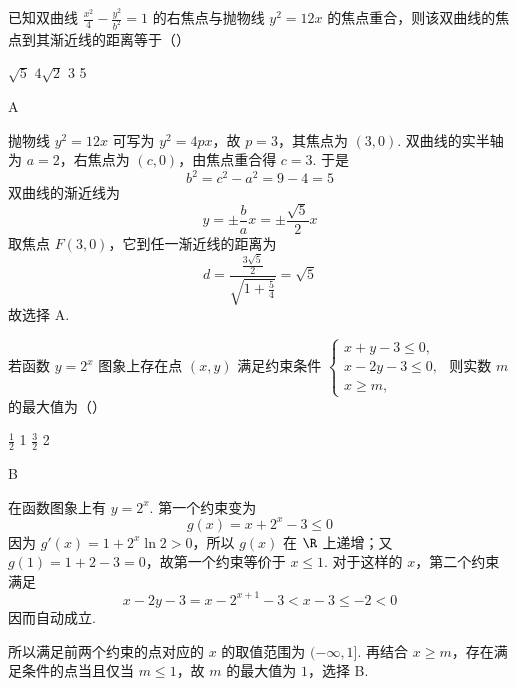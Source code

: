 \begin{problem}
已知双曲线 \(\frac{x^{2}}{4} - \frac{y^{2}}{b^{2}} = 1\) 的右焦点与抛物线 \(y^{2} = 12x\) 的焦点重合，则该双曲线的焦点到其渐近线的距离等于（\quad）

\choices
    {\(\sqrt{5}\)}
    {\(4\sqrt{2}\)}
    {3}
    {5}
\end{problem}

\begin{answer}
A
\end{answer}

\begin{solution}
抛物线 \(y^{2}=12x\) 可写为 \(y^{2}=4px\)，故 \(p=3\)，其焦点为 \((3,0)\). 双曲线的实半轴为 \(a=2\)，右焦点为 \((c,0)\)，由焦点重合得 \(c=3\). 于是
\[
b^{2}=c^{2}-a^{2}=9-4=5
\]
双曲线的渐近线为
\[
y=\pm\frac{b}{a}x=\pm\frac{\sqrt5}{2}x
\]
取焦点 \(F(3,0)\)，它到任一渐近线的距离为
\[
d=\frac{\frac{3\sqrt5}{2}}{\sqrt{1+\frac54}}=\sqrt5
\]
故选择 A.
\end{solution}

\begin{problem}
若函数 \(y = 2^{x}\) 图象上存在点 \((x,y)\) 满足约束条件 \(\begin{cases}
x + y - 3 \leqslant 0,\\
x - 2y - 3 \leqslant 0,\\
x \geqslant m,
\end{cases}\) 则实数 \(m\) 的最大值为（\quad）

\choices
    {\(\frac{1}{2}\)}
    {1}
    {\(\frac{3}{2}\)}
    {2}
\end{problem}

\begin{answer}
B
\end{answer}

\begin{solution}
在函数图象上有 \(y=2^{x}\). 第一个约束变为
\[
g(x)=x+2^{x}-3\leqslant0
\]
因为 \(g'(x)=1+2^{x}\ln2>0\)，所以 \(g(x)\) 在 \(\R\) 上递增；又 \(g(1)=1+2-3=0\)，故第一个约束等价于 \(x\leqslant1\). 对于这样的 \(x\)，第二个约束满足
\[
x-2y-3=x-2^{x+1}-3<x-3\leqslant-2<0
\]
因而自动成立.

所以满足前两个约束的点对应的 \(x\) 的取值范围为 \((-\infty,1]\). 再结合 \(x\geqslant m\)，存在满足条件的点当且仅当 \(m\leqslant1\)，故 \(m\) 的最大值为 \(1\)，选择 B.
\end{solution}

